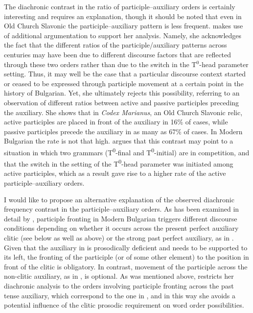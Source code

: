 \documentclass[output=paper,modfonts,newtxmath,hidelinks]{langscibook}
\begin{document}
The diachronic contrast in the ratio of participle--auxiliary orders is certainly interesting and requires an explanation, though it should be noted that even in Old Church Slavonic the participle--auxiliary pattern is less frequent. \citet{pancheva2008} makes use of additional argumentation to support her analysis. Namely, she acknowledges the fact that the different ratios of the participle/auxiliary patterns across centuries may have been due to different discourse factors that are reflected through these two orders rather than due to the switch in the T$^0$-head parameter setting. Thus, it may well be the case that a particular discourse context started or ceased to be expressed through participle movement at a certain point in the history of Bulgarian. Yet, she ultimately rejects this possibility, referring to an observation of different ratios between active and passive participles preceding the auxiliary. She shows that in \textit{Codex Marianus}, an Old Church Slavonic relic, active participles are placed in front of the auxiliary in 16\% of cases, while passive participles precede the auxiliary in as many as 67\% of cases. In Modern Bulgarian the rate is not that high. \citeauthor{pancheva2008} argues that this contrast may point to a situation in which two grammars (T\textsuperscript{0}{}-final and T\textsuperscript{0}{}-initial) are in competition, and that the switch in the setting of the T\textsuperscript{0}{}-head parameter was initiated among active participles, which as a result gave rise to a higher rate of the active participle--auxiliary orders.

I would like to propose an alternative explanation of the observed diachronic frequency contrast in the participle--auxiliary orders. As has been examined in detail by \citet{lambova2003}, participle fronting in Modern Bulgarian triggers different discourse conditions depending on whether it occurs across the present perfect auxiliary clitic (see  below as well as  above) or the strong past perfect auxiliary, as in . Given that the auxiliary in  is prosodically deficient and needs to be supported to its left, the fronting of the participle (or of some other element) to the position in front of the clitic is obligatory. In contrast, movement of the participle across the non-clitic auxiliary, as in , is optional. As was mentioned above, \citeauthor{pancheva2008} restricts her diachronic analysis to the orders involving participle fronting across the past tense auxiliary, which correspond to the one in , and in this way she avoids a potential influence of the clitic prosodic requirement on word order possibilities.
\end{document}
